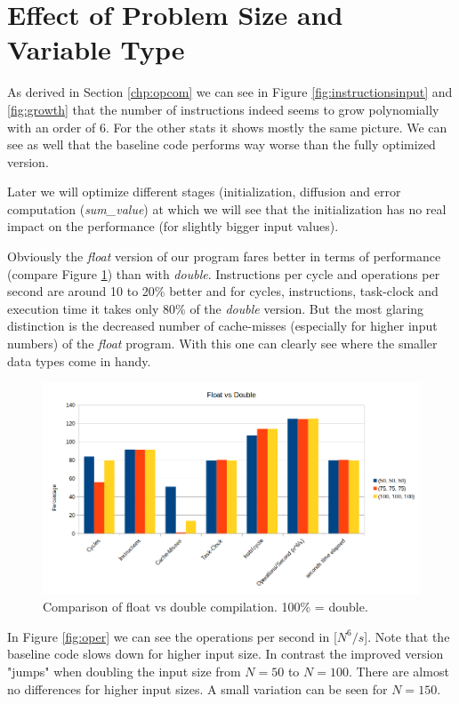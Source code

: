 \documentclass[12pt,a4paper]{article}
\begin{document}
\section{Effect of Problem Size and Variable Type}

As derived in Section \ref{chp:opcom} we can see in Figure \ref{fig:instructionsinput} and \ref{fig:growth} that the number of instructions indeed seems to grow polynomially with an order of 6. For the other stats it shows mostly the same picture. We can see as well that the baseline code performs way worse than the fully optimized version. 

Later we will optimize different stages (initialization, diffusion and error computation (\emph{sum\_value}) at which we will see that the initialization has no real impact on the performance (for slightly bigger input values). 

Obviously the \emph{float} version of our program fares better in terms of performance (compare Figure \ref{fig:floatvsdouble}) than with \emph{double}. Instructions per cycle and operations per second are around 10 to 20\% better and for cycles, instructions, task-clock and execution time it takes only 80\% of the \emph{double} version. But the most glaring distinction is the decreased number of cache-misses (especially for higher input numbers) of the \emph{float} program. With this one can clearly see where the smaller data types come in handy. 
\begin{figure}[h]
	\centering
	\includegraphics[width=1.0\linewidth]{"Benchmark 3/floatvsdouble"}
	\caption{Comparison of float vs double compilation. 100\% = double. }
	\label{fig:floatvsdouble}
\end{figure}



In Figure \ref{fig:oper} we can see the operations per second in [$N^6/s$]. Note that the baseline code slows down for higher input size. In contrast the improved version "jumps" when doubling the input size from $N=50$ to $N=100$. There are almost no differences for higher input sizes. A small variation can be seen for $N=150$.
\end{document}
